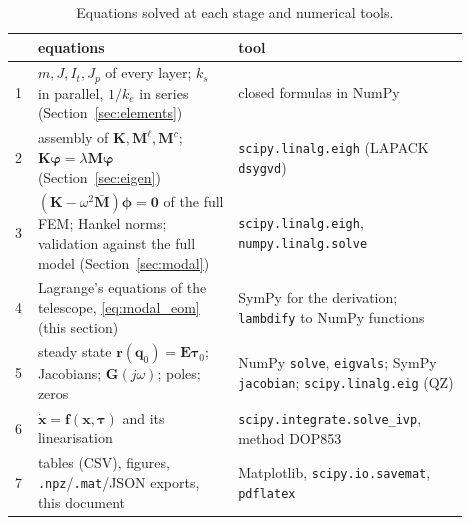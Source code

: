 \documentclass[10pt,a4paper]{article}
\numberwithin{equation}{section}
\begin{document}
\begin{table}[H]\centering\small
\caption{Equations solved at each stage and numerical tools.}\label{tab:stages}
\begin{tabular}{p{0.04\linewidth}p{0.4\linewidth}p{0.46\linewidth}}\toprule
& equations & tool \\ \midrule
1 & $m, J, I_t, J_p$ of every layer; $k_s$ in parallel, $1/k_e$ in series (Section~\ref{sec:elements}) & closed formulas in NumPy \\
2 & assembly of $\mathbf K,\mathbf M^{\ell},\mathbf M^{c}$; $\mathbf K\boldsymbol\varphi = \lambda\mathbf M\boldsymbol\varphi$ (Section~\ref{sec:eigen}) & \texttt{scipy.linalg.eigh} (LAPACK \texttt{dsygvd}) \\
3 & $(\mathbf K - \omega^2\bar{\mathbf M})\boldsymbol\phi = \mathbf 0$ of the full FEM; Hankel norms; validation against the full model (Section~\ref{sec:modal}) & \texttt{scipy.linalg.eigh}, \texttt{numpy.linalg.solve} \\
4 & Lagrange's equations of the telescope, \eqref{eq:modal_eom} (this section) & SymPy for the derivation; \texttt{lambdify} to NumPy functions \\
5 & steady state $\mathbf r(\mathbf q_0) = \mathbf E\boldsymbol\tau_0$; Jacobians; $\mathbf G(j\omega)$; poles; zeros & NumPy \texttt{solve}, \texttt{eigvals}; SymPy \texttt{jacobian}; \texttt{scipy.linalg.eig} (QZ) \\
6 & $\dot{\mathbf x} = \mathbf f(\mathbf x,\boldsymbol\tau)$ and its linearisation & \texttt{scipy.integrate.solve\_ivp}, method DOP853 \\
7 & tables (CSV), figures, \texttt{.npz}/\texttt{.mat}/JSON exports, this document & Matplotlib, \texttt{scipy.io.savemat}, \texttt{pdflatex} \\ \bottomrule
\end{tabular}\end{table}
\end{document}

